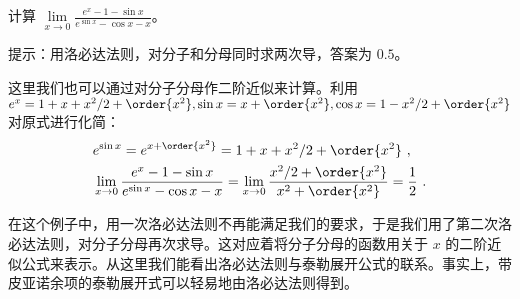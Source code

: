 \begin{exercise}{}
计算 $\lim\limits_{x\rightarrow 0}\frac{e^x-1-\sin x}{e^{\sin x} - \cos x - x}$。
\end{exercise}
提示：用洛必达法则，对分子和分母同时求两次导，答案为 $0.5$。

这里我们也可以通过对分子分母作二阶近似来计算。利用 $e^x=1+x+x^2/2+\order{x^2},\sin x=x+\order{x^2},\cos x=1-x^2/2+\order{x^2}$ 对原式进行化简：
\begin{equation}
\begin{aligned}
&e^{\sin x}=e^{x+\order{x^2}}=1+x+x^2/2+\order{x^2}~,\\
&\lim\limits_{x\rightarrow 0}\frac{e^x-1-\sin x}{e^{\sin x} - \cos x - x}=\lim\limits_{x\rightarrow 0}\frac{x^2/2+\order{x^2}}{x^2+\order{x^2}}=\frac{1}{2}~.
\end{aligned}
\end{equation}

在这个例子中，用一次洛必达法则不再能满足我们的要求，于是我们用了第二次洛必达法则，对分子分母再次求导。这对应着将分子分母的函数用关于 $x$ 的二阶近似公式来表示。从这里我们能看出洛必达法则与泰勒展开公式的联系。事实上，带皮亚诺余项的泰勒展开式可以轻易地由洛必达法则得到。

